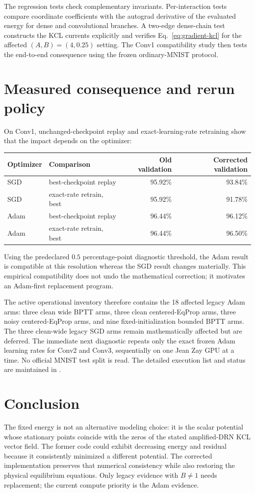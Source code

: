 \documentclass[11pt]{article}
\begin{document}
The regression tests check complementary invariants.  Per-interaction tests
compare coordinate coefficients with the autograd derivative of the evaluated
energy for dense and convolutional branches.  A two-edge dense-chain test
constructs the KCL currents explicitly and verifies Eq.~\eqref{eq:gradient-kcl}
for the affected $(A,B)=(4,0.25)$ setting.  The Conv1 compatibility study then
tests the end-to-end consequence using the frozen ordinary-MNIST protocol.

\section{Measured consequence and rerun policy}

On Conv1, unchanged-checkpoint replay and exact-learning-rate retraining show
that the impact depends on the optimizer:
\begin{center}
\begin{tabular}{llrr}
\toprule
Optimizer & Comparison & Old validation & Corrected validation\\
\midrule
SGD & best-checkpoint replay & 95.92\% & 93.84\%\\
SGD & exact-rate retrain, best & 95.92\% & 91.78\%\\
Adam & best-checkpoint replay & 96.44\% & 96.12\%\\
Adam & exact-rate retrain, best & 96.44\% & 96.50\%\\
\bottomrule
\end{tabular}
\end{center}
Using the predeclared $0.5$ percentage-point diagnostic threshold, the Adam
result is compatible at this resolution whereas the SGD result changes
materially.  This empirical compatibility does not undo the mathematical
correction; it motivates an Adam-first replacement program.

The active operational inventory therefore contains the 18 affected legacy
Adam arms: three clean wide BPTT arms, three clean centered-EqProp arms, three
noisy centered-EqProp arms, and nine fixed-initialization bounded BPTT arms.
The three clean-wide legacy SGD arms remain mathematically affected but are
deferred.  The immediate next diagnostic repeats only the exact frozen Adam
learning rates for Conv2 and Conv3, sequentially on one Jean Zay GPU at a time.
No official MNIST test split is read.  The detailed execution list and status
are maintained in
.

\section{Conclusion}

The fixed energy is not an alternative modeling choice: it is the scalar
potential whose stationary points coincide with the zeros of the stated
amplified-DRN KCL vector field.  The former code could exhibit decreasing
energy and residual because it consistently minimized a different potential.
The corrected implementation preserves that numerical consistency while also
restoring the physical equilibrium equations.  Only legacy evidence with
$B\neq1$ needs replacement; the current compute priority is the Adam evidence.
\end{document}

